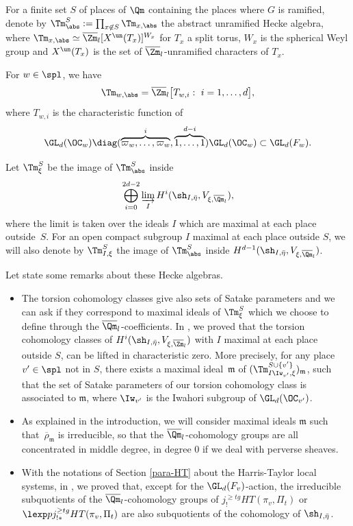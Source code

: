 \begin{defin}
For a finite set $S$ of places of $\Qm$ containing the places where $G$ is ramified,
denote by $\Tm^S_{\abs}:=\prod_{x \not \in S} \Tm_{x,\abs}$ the
abstract unramified Hecke algebra, where
$\Tm_{x,\abs} \simeq \overline \Zm_l[X^{\un}(T_x)]^{W_x}$ for $T_x$ a split torus,
$W_x$ is the spherical Weyl group and $X^{\un}(T_x)$ is the set of $\overline \Zm_l$-unramified
characters of $T_x$.
\end{defin}

\begin{example}
For $w \in \spl$, we have
\[
\Tm_{w,\abs}=\overline \Zm_l \bigl [T_{w,i}:~ i=1,\dots,d \bigr ],
\]
where $T_{w,i}$ is the characteristic function of
\[
\GL_d(\OC_w) \diag(\overbrace{\varpi_w,\dots,\varpi_w}^{i}, \overbrace{1,\dots,1}^{d-i})
\GL_d(\OC_w) \subset \GL_d(F_w).
\]
\end{example}

\begin{nota}
Let $\Tm^S_\xi$ be the image of $\Tm^S_{\abs}$ inside
\[
\bigoplus_{i =0}^{2d-2}
\varinjlim_{{I}} H^i(\sh_{I,\bar \eta},V_{\xi,\overline \Qm_l}),
\]
where the limit is taken over
the ideals $I$ which are maximal at each place outside~$S$. For an open compact subgroup $I$ maximal at each place outside $S$,
we will also denote by $\Tm^S_{I,\xi}$ the image of $\Tm^S_{\abs}$ inside
$H^{d-1}(\sh_{I,\bar \eta},V_{\xi,\overline \Qm_l})$.
\end{nota}

Let state some remarks about these Hecke algebras.
\begin{itemize}
\item The torsion cohomology classes give also sets of Satake parameters
and we can ask if they correspond to maximal ideals of $\Tm_\xi^S$ which
we choose to define through the $\overline \Qm_l$\nobreakdash-coefficients.
In \cite{boyer-imj}, we proved that the torsion cohomology classes of
$H^i(\sh_{I,\bar \eta},V_{\xi,\overline \Zm_l})$ with
$I$ maximal at each place outside $S$, can be lifted in characteristic zero.
More precisely, for any place $v' \in \spl$ not in $S$, there exists
a maximal ideal~$\mathfrak m$ of
$(\Tm^{S \cup \{v'\} }_{I\Iw_{v'},\xi})_{\mathfrak m}$,
such that the set of Satake parameters of our torsion cohomology class
is associated to $\mathfrak m$, where $\Iw_{v'}$ is the Iwahori subgroup of $\GL_d(\OC_{v'})$.

\item As explained in the introduction, we will consider maximal ideals
$\mathfrak m$ such that~$\overline \rho_{\mathfrak m}$ is irreducible, so that
the $\overline \Qm_l$-cohomology groups are all concentrated in middle degree,
\ie in degree $0$ if we deal with perverse sheaves.

\item With the notations of Section \ref{para-HT} about the Harris-Taylor local systems,
in \cite{boyer-compositio}, we proved that, except for the $\GL_d(F_v)$-action,
the irreducible subquotients of the
$\overline \Qm_l$-cohomology groups of $j^{\geq tg}_! HT(\pi_v,\Pi_t)$ or
$\lexp p j^{\geq tg}_{!*} HT(\pi_v,\Pi_t)$ are also subquotients of
the cohomology of $\sh_{I,\bar \eta}$.
\end{itemize}

